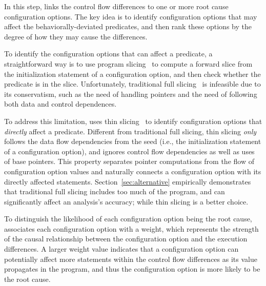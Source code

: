 



In this step, \ourtool links the control flow differences
to one or more root cause configuration options.
The key idea is to identify configuration options that
may affect the behaviorally-deviated predicates, and then rank
these options by the degree of how they may cause
the differences.


To identify the configuration options that can affect
a predicate, a straightforward way is to use program slicing~\cite{Weiser:1981}
to compute a forward slice from the initialization statement
of a configuration option, and then check whether the predicate is
in the slice. Unfortunately, traditional
full slicing~\cite{Weiser:1981} is infeasible due
to its conservatism, such as the need of handling pointers
and the need of following both data and control dependences.


To address this limitation, \ourtool uses thin slicing~\cite{Sridharan:2007}
to identify configuration options that \textit{directly} affect
a predicate. Different from traditional full slicing,
thin slicing \textit{only} follows the data flow dependencies
from the seed (i.e., the initialization statement of a
configuration option), and ignores control flow dependencies
as well as uses of base pointers. This property separates
pointer computations from the flow of configuration option
values and naturally connects a configuration option with its
directly affected statements. Section~\ref{sec:alternative}
empirically demonstrates that traditional full slicing includes
too much of the program, and can significantly affect an analysis's
accuracy; while thin slicing is a better
choice.


To distinguish the likelihood of each configuration
option being the root cause, \ourtool associates each
configuration option with a weight, which represents the strength of
the causal relationship between the configuration option
and the execution differences.
A larger weight value indicates that a configuration option
can potentially affect more statements within the control
flow differences as its value propagates in the program, and thus
the configuration option is more likely
to be the root cause.

